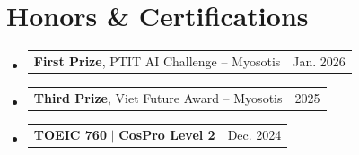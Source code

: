 \documentclass[a4paper,11pt]{article}
\makeatletter
\newcommand{\resumeProjectHeading}[2]{
  \item
    \begin{tabular*}{0.97\textwidth}{l@{\extracolsep{\fill}}r}
      \small #1 & \small #2 \\
    \end{tabular*}\vspace{-8pt}
}
\newcommand{\resumeSubHeadingListStart}{\begin{itemize}[leftmargin=0.15in, label={}]}
\newcommand{\resumeSubHeadingListEnd}{\end{itemize}\vspace{-1pt}}
\makeatother
\begin{document}
\section{Honors \& Certifications}
\resumeSubHeadingListStart
  \resumeProjectHeading
    {\textbf{First Prize}, PTIT AI Challenge -- Myosotis}{Jan. 2026}
  \resumeProjectHeading
    {\textbf{Third Prize}, Viet Future Award -- Myosotis}{2025}
  \resumeProjectHeading
    {\textbf{TOEIC 760} $|$ \textbf{CosPro Level 2}}{Dec. 2024}
\resumeSubHeadingListEnd
\end{document}
